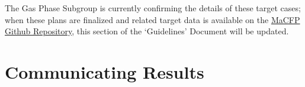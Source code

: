 \documentclass[12pt]{article}
\begin{document}
The Gas Phase Subgroup is currently confirming the details of these target cases; when these plans are finalized and related target data is available on the \href{https://github.com/MaCFP/macfp-db}{MaCFP Github Repository}, this section of the `Guidelines' Document will be updated.
%
%
%

\section{Communicating Results}
\label{sec:Com-Results}
\end{document}
